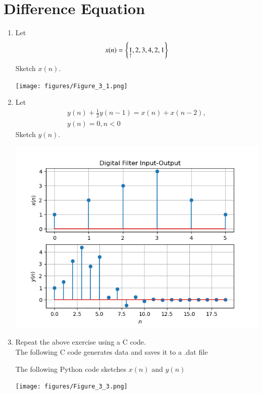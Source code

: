 \documentclass[journal,12pt,twocolumn]{IEEEtran}
\renewcommand\thesection{\arabic{section}}
\begin{document}
\section{Difference Equation}
\begin{enumerate}[label=\thesection.\arabic*,ref=\thesection.\theenumi]
\item Let
 \label{def:xn}
\begin{equation}
x(n) = \left\{\underset{\uparrow}{1},2,3,4,2,1\right\}
\end{equation}
Sketch $x(n)$.
\\
\solution

\texttt{[image: figures/Figure\_3\_1.png]}
\item Let
\begin{multline}
\label{eq:iir_filter}
y(n) + \frac{1}{2}y(n-1) = x(n) + x(n-2),
\\
 y(n) = 0, n < 0
\end{multline}
Sketch $y(n)$.  
\\
\solution 

\includegraphics[width=\columnwidth]{figures/Figure_3_2.png}

\item Repeat the above exercise using a C code.
\\
\solution
The following C code generates data and saves it to a .dat file

The following Python code sketches $x(n)$ and $y(n)$

\texttt{[image: figures/Figure\_3\_3.png]}
\end{enumerate}
\end{document}
